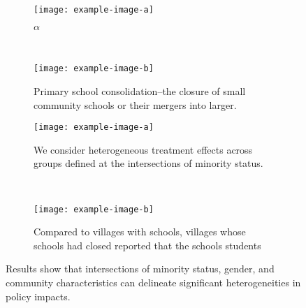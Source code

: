 \documentclass[12pt,english]{article}
\begin{document}
\par\medskip
\newcommand{\subFigWidth}{0.27}
\newcommand{\subFigGraphWidth}{0.90}
\newcommand{\maincapwidth}{0.80}
\begin{figure}[H]
    \centering
    \begin{subfigure}[t]{\subFigWidth\textwidth}
        \centering
        \texttt{[image: example-image-a]}
        \captionsetup{width=\subFigGraphWidth\textwidth}
        \caption{$\alpha$}
    \end{subfigure}~
	\begin{subfigure}[t]{\subFigWidth\textwidth}
	    \centering
    	\texttt{[image: example-image-b]}
    	\captionsetup{width=\subFigGraphWidth\textwidth}
    	\caption{Primary school consolidation--the closure of small community schools or their mergers into larger.}
	\end{subfigure}
	\par\medskip
	\begin{subfigure}[t]{\subFigWidth\textwidth}
        \centering
        \texttt{[image: example-image-a]}
        \captionsetup{width=\subFigGraphWidth\textwidth}
        \caption{We consider heterogeneous treatment effects across groups defined at the intersections of minority status.}
    \end{subfigure}~
	\begin{subfigure}[t]{\subFigWidth\textwidth}
	    \centering
	    \captionsetup{width=\subFigGraphWidth\textwidth}
    	\texttt{[image: example-image-b]}
    	\caption{Compared to villages with schools, villages whose schools had closed reported that the schools students}
	\end{subfigure}
	\captionsetup{width=\maincapwidth\textwidth}
	\caption{Results show that intersections of minority status, gender, and community characteristics can delineate significant heterogeneities in policy impacts.}
	\label{fig:verthorz}
\end{figure}
\pagebreak
\end{document}
